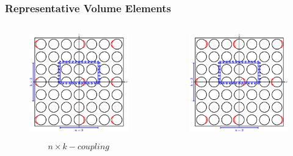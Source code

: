 \documentclass[first,firstsupp,lastsupp,last,hyperref,table]{ETHclass}
\begin{document}
\begin{frame}
\frametitle{\small Representative Volume Elements}
\vspace{-1cm}
\centering
\begin{columns}[c]
\begin{column}{0.5\textwidth}
\centering
\begin{figure}
\centering
\includegraphics[width=\columnwidth]{coupling.pdf}
\end{figure}
\vspace{-0.25cm}
\begin{equation*}
n\times k-coupling
\end{equation*}
\end{column}
\begin{column}{0.5\textwidth}
\centering
\begin{figure}
\centering
\includegraphics[width=\columnwidth]{asymm.pdf}

\end{figure}
\end{column}
\end{columns}
\end{frame}
\end{document}
